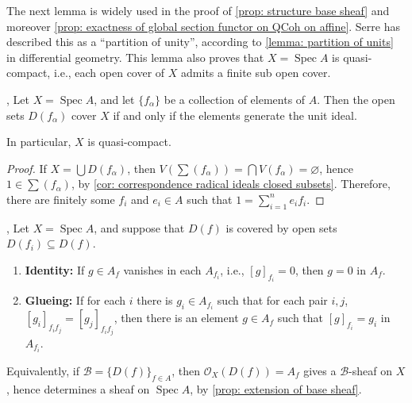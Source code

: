 \documentclass[11pt]{article}
\newcommand{\Spec}{\operatorname{Spec}}
\begin{document}
The next lemma is widely used in the proof of \autoref{prop: structure base sheaf} 
and moreover \autoref{prop: exactness of global section functor on QCoh on affine}. 
Serre has described this as a ``partition of unity'', 
according to \autoref{lemma: partition of units} in differential geometry. 
This lemma also proves that $ X =\Spec A $ is quasi-compact, 
i.e., each open cover of $ X $ admits a finite sub open cover. 

\begin{lemma}
    \label{lemma: partition of unity}
    \cite[Exercise II.2.13(b)]{hartsAG}, 
    \cite[Lemma I-16]{EisenbudHarris} 
    Let $ X = \Spec A$, and let $ \{f_{\alpha}\} $ be a collection 
    of elements of $ A $. Then the open sets $ D(f_{\alpha}) $ 
    cover $ X $ if and only if the elements generate the unit 
    ideal. 

    In particular, $ X $ is quasi-compact. 
\end{lemma}

\begin{proof}
    If $ X = \bigcup D(f_{\alpha}) $, then 
    $V(\sum (f_{\alpha})) = \bigcap V(f_{\alpha})= \varnothing $, 
    hence $ 1 \in \sum (f_{\alpha}) $, by \autoref{cor: correspondence radical ideals closed subsets}. 
    Therefore, there are finitely some $ f_{i} $ and $ e_{i} \in A $ 
    such that $ 1 = \sum_{i=1}^{n} e_{i}f_{i} $.  
\end{proof}

\begin{proposition}
    \label{prop: structure base sheaf}
    \cite[Lemma I-17]{EisenbudHarris}, 
    \cite[Theorem 4.1.2]{vakilTheRisingSea}
    Let $ X = \Spec A$, and suppose that $ D(f) $ 
    is covered by open sets $ D(f_{i}) \subseteq D(f) $. 
    \begin{enumerate}[label = (\alph*)]
        \item \textbf{Identity:} If $ g \in A_{f} $ vanishes in each $ A_{f_{i}} $, i.e., $ [g]_{f_{i}}=0 $, 
            then $ g =0 $ in $ A_{f} $. 
        \item \textbf{Glueing:} If for each $ i $ there is $ g_{i} \in A_{f_{i}} $ 
            such that for each pair $ i,j $, 
            $ [g_{i}]_{f_{i}f_{j}} = [g_{j}]_{f_{i}f_{j}} $, 
            then there is an element $ g \in A_{f} $ 
            such that $ [g]_{f_{i}}=g_{i} $ in $ A_{f_{i}} $. 
    \end{enumerate}

    Equivalently, if $ \mathcal{B}=\{D(f)\}_{f \in A} $, 
    then $ \mathscr{O}_{X}(D(f))=A_{f} $ gives a $ \mathcal{B} $-sheaf 
    on $ X $, hence determines a sheaf on $ \Spec A $, 
    by \autoref{prop: extension of base sheaf}. 
\end{proposition}
\end{document}

